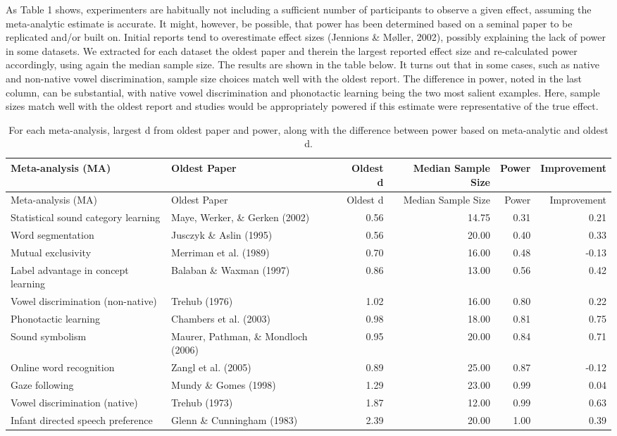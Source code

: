 \documentclass[english,floatsintext,man]{apa6}
\begin{document}
As Table 1 shows, experimenters are habitually not including a
sufficient number of participants to observe a given effect, assuming
the meta-analytic estimate is accurate. It might, however, be possible,
that power has been determined based on a seminal paper to be replicated
and/or built on. Initial reports tend to overestimate effect sizes
(Jennions \& M{ø}ller, 2002), possibly explaining the lack of power in
some datasets. We extracted for each dataset the oldest paper and
therein the largest reported effect size and re-calculated power
accordingly, using again the median sample size. The results are shown
in the table below. It turns out that in some cases, such as native and
non-native vowel discrimination, sample size choices match well with the
oldest report. The difference in power, noted in the last column, can be
substantial, with native vowel discrimination and phonotactic learning
being the two most salient examples. Here, sample sizes match well with
the oldest report and studies would be appropriately powered if this
estimate were representative of the true effect.

\begin{longtable}[c]{@{}llrrrr@{}}
\caption{For each meta-analysis, largest d from oldest paper and power,
along with the difference between power based on meta-analytic and
oldest d.}\tabularnewline
\toprule
Meta-analysis (MA) & Oldest Paper & Oldest d & Median Sample Size &
Power & Improvement\tabularnewline
\midrule
\endfirsthead
\toprule
Meta-analysis (MA) & Oldest Paper & Oldest d & Median Sample Size &
Power & Improvement\tabularnewline
\midrule
\endhead
Statistical sound category learning & Maye, Werker, \& Gerken (2002) &
0.56 & 14.75 & 0.31 & 0.21\tabularnewline
Word segmentation & Jusczyk \& Aslin (1995) & 0.56 & 20.00 & 0.40 &
0.33\tabularnewline
Mutual exclusivity & Merriman et al. (1989) & 0.70 & 16.00 & 0.48 &
-0.13\tabularnewline
Label advantage in concept learning & Balaban \& Waxman (1997) & 0.86 &
13.00 & 0.56 & 0.42\tabularnewline
Vowel discrimination (non-native) & Trehub (1976) & 1.02 & 16.00 & 0.80
& 0.22\tabularnewline
Phonotactic learning & Chambers et al. (2003) & 0.98 & 18.00 & 0.81 &
0.75\tabularnewline
Sound symbolism & Maurer, Pathman, \& Mondloch (2006) & 0.95 & 20.00 &
0.84 & 0.71\tabularnewline
Online word recognition & Zangl et al. (2005) & 0.89 & 25.00 & 0.87 &
-0.12\tabularnewline
Gaze following & Mundy \& Gomes (1998) & 1.29 & 23.00 & 0.99 &
0.04\tabularnewline
Vowel discrimination (native) & Trehub (1973) & 1.87 & 12.00 & 0.99 &
0.63\tabularnewline
Infant directed speech preference & Glenn \& Cunningham (1983) & 2.39 &
20.00 & 1.00 & 0.39\tabularnewline
\bottomrule
\end{longtable}
\end{document}
